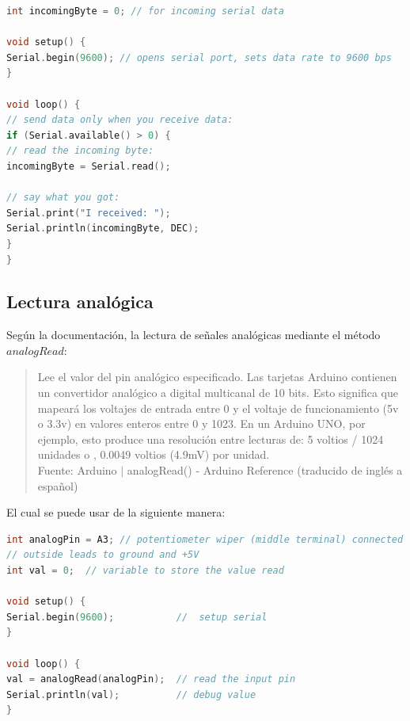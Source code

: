 \documentclass{article}
\begin{document}
\begin{lstlisting}[language=C, caption=Uso del método read. \footnotesize Fuente: Serial - Arduino Reference (read) \cite{arduino-serial}]
int incomingByte = 0; // for incoming serial data

void setup() {
Serial.begin(9600); // opens serial port, sets data rate to 9600 bps
}

void loop() {
// send data only when you receive data:
if (Serial.available() > 0) {
// read the incoming byte:
incomingByte = Serial.read();

// say what you got:
Serial.print("I received: ");
Serial.println(incomingByte, DEC);
}
}
\end{lstlisting}

\subsection{Lectura analógica}

Según la documentación, la lectura de señales analógicas mediante el método $analogRead$:

\begin{quote}
Lee el valor del pin analógico especificado. Las tarjetas Arduino contienen un convertidor analógico a digital multicanal de 10 bits. Esto significa que mapeará los voltajes de entrada entre 0 y el voltaje de funcionamiento (5v o 3.3v) en valores enteros entre 0 y 1023. En un Arduino UNO, por ejemplo, esto produce una resolución entre lecturas de: 5 voltios / 1024 unidades o , 0.0049 voltios (4.9mV) por unidad. \\ \footnotesize
Fuente: Arduino $\mid$ analogRead() - Arduino Reference (traducido de inglés a español) \cite{arduino-analogRead}
\end{quote}

El cual se puede usar de la siguiente manera:

\begin{lstlisting}[language=C, caption=Uso del método analogRead. \footnotesize Fuente: analogRead() - Arduino Reference \cite{arduino-analogRead}]
int analogPin = A3; // potentiometer wiper (middle terminal) connected to analog pin 3
// outside leads to ground and +5V
int val = 0;  // variable to store the value read

void setup() {
Serial.begin(9600);           //  setup serial
}

void loop() {
val = analogRead(analogPin);  // read the input pin
Serial.println(val);          // debug value
}
\end{lstlisting}
\end{document}
